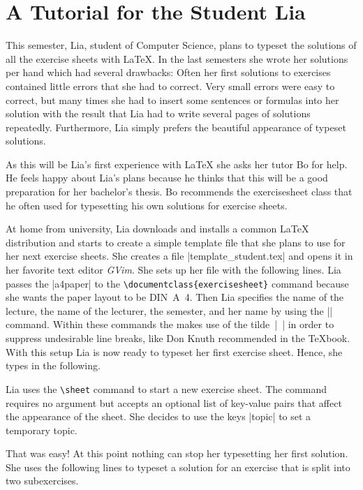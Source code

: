 \documentclass[a4paper,fleqn]{report}
\def\exercisesheet{{exercisesheet}}
\begin{document}
\section{A Tutorial for the Student Lia}

This semester, Lia, student of Computer Science, plans to typeset the
solutions of all the exercise sheets with \LaTeX{}. In the last
semesters she wrote her solutions per hand which had several
drawbacks: Often her first solutions to exercises contained little
errors that she had to correct. Very small errors were easy to
correct, but many times she had to insert some sentences or formulas
into her solution with the result that Lia had to write several pages
of solutions repeatedly. Furthermore, Lia simply prefers the beautiful
appearance of typeset solutions.

As this will be Lia's first experience with \LaTeX{} she asks her
tutor Bo for help. He feels happy about Lia's plans because he thinks
that this will be a good preparation for her bachelor's thesis. Bo
recommends the \exercisesheet{} class that he often used for
typesetting his own solutions for exercise sheets.

At home from university, Lia downloads and installs a common \LaTeX{}
distribution and starts to create a simple template file that she
plans to use for her next exercise sheets. She creates a file
|template_student.tex| and opens it in her favorite text editor
\emph{GVim}. She sets up her file with the following lines.
 Lia passes the
|a4paper| to the \lstinline|\documentclass{exercisesheet}| command
because she wants the paper layout to be DIN~A~4. Then Lia specifies
the name of the lecture, the name of the lecturer, the semester, and
her name by using the |\sheetconf| command. Within these commands the
makes use of the tilde~|~| in order to suppress undesirable line
breaks, like Don Knuth recommended in the \TeX{}book. With this setup
Lia is now ready to typeset her first exercise sheet. Hence, she types
in the following.

Lia uses the \lstinline|\sheet| command to start a new exercise sheet.
The command requires no argument but accepts an optional list of
key-value pairs that affect the appearance of the sheet. She decides
to use the keys |topic| to set a temporary topic.

That was easy! At this point nothing can stop her typesetting her
first solution. She uses the following lines to typeset a solution for
an exercise that is split into two subexercises.
\end{document}
